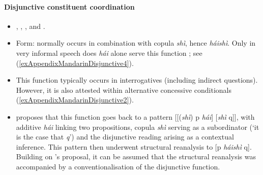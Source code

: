\paragraph{Disjunctive constituent coordination}\label{appendixMandarinCoordination}
\begin{itemize}
	\item \textcite[11–1121]{Donazzan2008}, \textcite[27]{HuangShi2016}, \textcite{Lu2019}, \textcite[339]{Wiedenhof2015} and \textcite[433–434]{ZhanBai2016}.
	\item Form: normally occurs in combination with copula \textit{shì}, hence \textit{háishì}. Only in very informal speech does \textit{hái} alone serve this function \parencite[39]{Wiedenhof2015}; see (\ref{exAppendixMandarinDisjunctive4}).
	\item This function typically occurs in interrogatives (including indirect questions). However, it is also attested within alternative concessive conditionals (\ref{exAppendixMandarinDisjunctive2}).
	\item \textcite{Lu2019} proposes that this function goes back to a pattern [[(\textit{shì}) p \textit{hái}] [\textit{shì} q]], with additive \textit{hái} linking two propositions, copula \textit{shì} serving as a subordinator (\lq it is the case that \textit{q}') and the disjunctive reading arising as a contextual inference. This pattern then underwent structural reanalysis to [p \textit{háishì} q]. Building on \citeauthor{Lu2019}'s proposal, it can be assumed that the structural reanalysis was accompanied by a conventionalisation of the disjunctive function.
\end{itemize}

